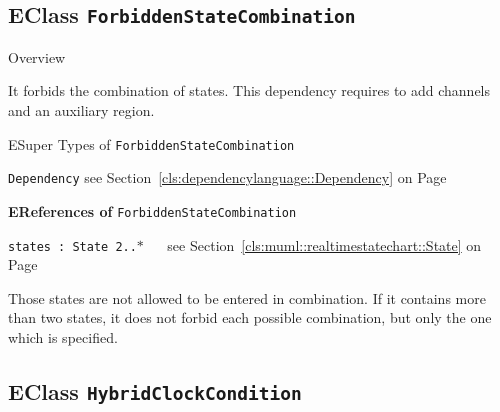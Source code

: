 \subsection{EClass \bfseries \texttt{ForbiddenStateCombination}\normalfont}
\label{cls:dependencylanguage::ForbiddenStateCombination} 
	
	\begin{longdescription}
		\item[Overview] 		
				

	

		It forbids the combination of states. This dependency requires to add channels and an auxiliary region.		
		\item[ESuper Types of \texttt{ForbiddenStateCombination}] ~
			\begin{longdescription}
				\item[\texttt{Dependency}] see Section~\ref{cls:dependencylanguage::Dependency} on Page~\pageref{cls:dependencylanguage::Dependency}						\end{longdescription}
		
	
			\item[\textbf{EReferences of} \texttt{ForbiddenStateCombination}] ~
			\begin{longdescription}
	\item[\texttt{states : State \symbol{"5B}2..$*$\symbol{"5D}
}] ~
	see Section~\ref{cls:muml::realtimestatechart::State} on Page~\pageref{cls:muml::realtimestatechart::State}
	
	\nopagebreak
		
				

	

		Those states are not allowed to be entered in combination.
If it contains more than two states, it does not forbid each possible combination, but only the one which is specified.		
			\end{longdescription}
	
	\end{longdescription}
	

\subsection{EClass \bfseries \texttt{HybridClockCondition}\normalfont}
\label{cls:dependencylanguage::HybridClockCondition} 
	
